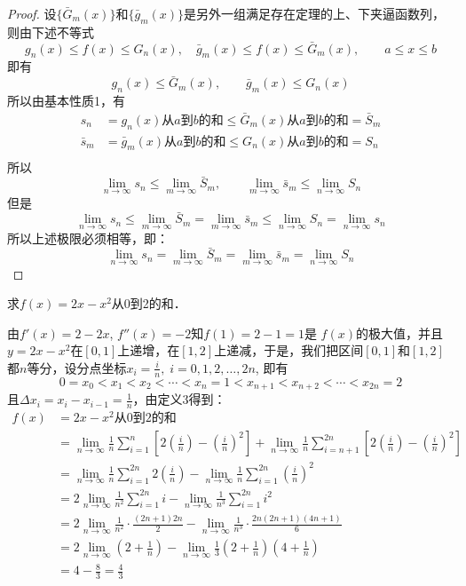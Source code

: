 \begin{proof}
    设$\{\bar G_m(x)\}$和$\{\bar g_m(x)\}$是另外一组满足存在定理的上、下夹逼函数列，则由下述不等式
\[g_n(x)\le f(x)\le G_n(x),\quad \bar g_m(x)\le f(x)\le \bar G_m(x),\qquad a\le x\le b\]
即有
\[g_n(x)\le \bar G_m(x),\qquad \bar g_m(x)\le G_n(x)\]
所以由基本性质1，有
\begin{align*}
    s_n&=g_n(x)\text{从$a$到$b$的和}\le \bar G_m(x)\text{从$a$到$b$的和}=\bar S_m\\
    \bar s_m&=\bar g_m(x)\text{从$a$到$b$的和}\le G_n(x)\text{从$a$到$b$的和}=S_n\\
\end{align*}
所以
\[\lim_{n\to\infty}s_n\le\lim_{m\to\infty}\bar S_m,\qquad \lim_{m\to\infty}\bar s_m\le \lim_{n\to\infty}S_n\]
但是
\[\lim_{n\to\infty}s_n\le \lim_{m\to\infty}\bar S_m=\lim_{m\to\infty}\bar s_m\le \lim_{n\to\infty} S_n=\lim_{n\to\infty}s_n\]
所以上述极限必须相等，即：
\[\lim_{n\to\infty}s_n= \lim_{m\to\infty}\bar S_m=\lim_{m\to\infty}\bar s_m=\lim_{n\to\infty} S_n\]
\end{proof}

\begin{example}
求$f(x)=2x-x^2$从0到2的和．
\end{example}

\begin{solution}
    由$f'(x)=2-2x$, $f''(x)=-2$知$f(1)=2-1=1$是
$f(x)$的极大值，并且$y=2x-x^2$在$[0, 1]$上递增，在$[1,2]$上递减，于是，我们把区间$[0, 1]$和$[1, 2]$都$n$等分，设分点坐标$x_i=\frac{i}{n},\; i=0, 1, 2,\ldots,2n$, 即有
\[0=x_0<x_1<x_2<\cdots <x_n=1<x_{n+1}<x_{n+2}<\cdots <x_{2n}=2\]
且$\Delta x_i=x_i-x_{i-1}=\frac{1}{n}$，由定义3得到：
\begin{align*}
    f(x)&=2x-x^2\text{从0到2的和}\\
    &=\lim_{n\to\infty}\frac{1}{n}\sum^n_{i=1}\left[2\left(\frac{i}{n}\right)-\left(\frac{i}{n}\right)^2\right]+\lim_{n\to\infty}\frac{1}{n}\sum^{2n}_{i=n+1}\left[2\left(\frac{i}{n}\right)-\left(\frac{i}{n}\right)^2\right] \\
&=\lim_{n\to\infty}\frac{1}{n}\sum^{2n}_{i=1}2\left(\frac{i}{n}\right)-\lim_{n\to\infty}\frac{1}{n}\sum^{2n}_{i=1}\left(\frac{i}{n}\right)^2\\
&=2\lim_{n\to\infty}\frac{1}{n^2}\sum^{2n}_{i=1}i-\lim_{n\to\infty}\frac{1}{n^3}\sum^{2n}_{i=1}i^2\\
&=2\lim_{n\to\infty}\frac{1}{n^2}\cdot \frac{(2n+1)2n}{2}-\lim_{n\to\infty}\frac{1}{n^3}\cdot \frac{2n(2n+1)(4n+1)}{6}\\
&=2\lim_{n\to\infty}\left(2+\frac{1}{n}\right)-\lim_{n\to\infty}\frac{1}{3}\left(2+\frac{1}{n}\right)\left(4+\frac{1}{n}\right)\\
&=4-\frac{8}{3}=\frac{4}{3}
\end{align*}
\end{solution}

